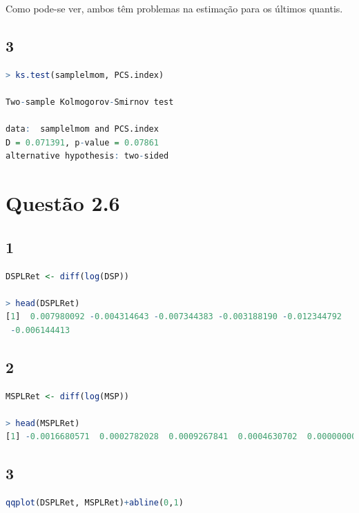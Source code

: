 \documentclass[12pt]{article}
\begin{document}
Como pode-se ver, ambos têm problemas na estimação para os últimos quantis.

\subsection*{3}
\begin{lstlisting}[language=R]
> ks.test(samplelmom, PCS.index)

Two-sample Kolmogorov-Smirnov test

data:  samplelmom and PCS.index
D = 0.071391, p-value = 0.07861
alternative hypothesis: two-sided
\end{lstlisting}

\section*{Questão 2.6}

\subsection*{1}
\begin{lstlisting}[language=R]
DSPLRet <- diff(log(DSP))

> head(DSPLRet)
[1]  0.007980092 -0.004314643 -0.007344383 -0.003188190 -0.012344792
 -0.006144413
\end{lstlisting}

\subsection*{2}
\begin{lstlisting}[language=R]
MSPLRet <- diff(log(MSP))

> head(MSPLRet)
[1] -0.0016680571  0.0002782028  0.0009267841  0.0004630702  0.0000000000  0.0011104943
\end{lstlisting}

\subsection*{3}

\begin{lstlisting}[language=R]
qqplot(DSPLRet, MSPLRet)+abline(0,1)
\end{lstlisting}
\end{document}
